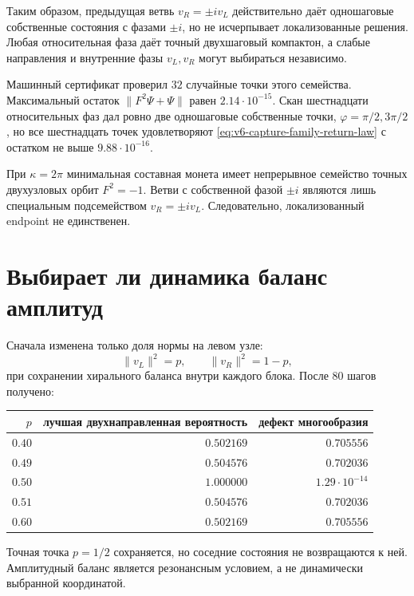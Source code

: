 Таким образом, предыдущая ветвь $v_R=\pm i v_L$ действительно даёт
одношаговые собственные состояния с фазами $\pm i$, но не исчерпывает
локализованные решения. Любая относительная фаза даёт точный двухшаговый
компактон, а слабые направления и внутренние фазы $v_L,v_R$ могут
выбираться независимо.

Машинный сертификат проверил $32$ случайные точки этого семейства.
Максимальный остаток $\|F^2\Psi+\Psi\|$ равен
$2.14\cdot10^{-15}$. Скан шестнадцати относительных фаз дал ровно две
одношаговые собственные точки, $\varphi=\pi/2,3\pi/2$, но все шестнадцать
точек удовлетворяют \eqref{eq:v6-capture-family-return-law} с остатком не
выше $9.88\cdot10^{-16}$.

\begin{theorem}
При $\kappa=2\pi$ минимальная составная монета имеет непрерывное семейство
точных двухузловых орбит $F^2=-1$. Ветви с собственной фазой $\pm i$
являются лишь специальным подсемейством $v_R=\pm i v_L$. Следовательно,
локализованный endpoint не единственен.
\end{theorem}

\section{Выбирает ли динамика баланс амплитуд}

Сначала изменена только доля нормы на левом узле:
\begin{equation}
 \|v_L\|^2=p,
 \qquad
 \|v_R\|^2=1-p,
\end{equation}
при сохранении хирального баланса внутри каждого блока. После $80$ шагов
получено:
\begin{center}
\begin{tabular}{@{}rrr@{}}
\toprule
$p$ & лучшая двухнаправленная вероятность & дефект многообразия \\
\midrule
$0.40$ & $0.502169$ & $0.705556$ \\
$0.49$ & $0.504576$ & $0.702036$ \\
$0.50$ & $1.000000$ & $1.29\cdot10^{-14}$ \\
$0.51$ & $0.504576$ & $0.702036$ \\
$0.60$ & $0.502169$ & $0.705556$ \\
\bottomrule
\end{tabular}
\end{center}
Точная точка $p=1/2$ сохраняется, но соседние состояния не возвращаются к
ней. Амплитудный баланс является резонансным условием, а не динамически
выбранной координатой.

